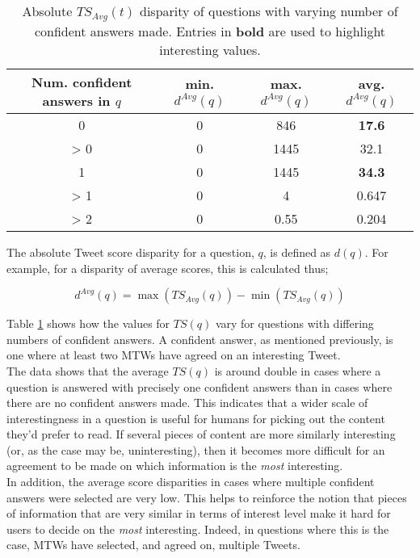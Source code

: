 \begin{table}[h]\footnotesize
\begin{center}
\begin{tabular}{ c | c | c | c }
	 Num. confident answers in $q$& min. $d^{Avg}(q)$ & max. $d^{Avg}(q)$ & avg. $d^{Avg}(q)$ \\
	 \hline
	0 & 0 & 846 & \textbf{17.6} \\
	> 0 & 0 & 1445 & 32.1 \\
	1 & 0 & 1445 & \textbf{34.3} \\
	> 1 & 0 & 4 & 0.647 \\
	> 2 & 0 & 0.55 & 0.204
\end{tabular}
\end{center}
\caption{Absolute $TS_{Avg}(t)$ disparity of questions with varying number of confident answers made. Entries in \textbf{bold} are used to highlight interesting values.}
\label{table:score_disparities}
\end{table}

The absolute Tweet score disparity for a question, $q$, is defined as $d(q)$. For example, for a disparity of average scores, this is calculated thus;

\[ d^{Avg}(q) = \max(TS_{Avg}(q)) - \min(TS_{Avg}(q)) \]

Table \ref{table:score_disparities} shows how the values for $TS(q)$ vary for questions with differing numbers of confident answers. A confident answer, as mentioned previously, is one where at least two MTWs have agreed on an interesting Tweet.\\
The data shows that the average $TS(q)$ is around double in cases where a question is answered with precisely one confident answers than in cases where there are no confident answers made. This indicates that a wider scale of interestingness in a question is useful for humans for picking out the content they'd prefer to read. If several pieces of content are more similarly interesting (or, as the case may be, uninteresting), then it becomes more difficult for an agreement to be made on which information is the \textit{most} interesting.\\
In addition, the average score disparities in cases where multiple confident answers were selected are very low. This helps to reinforce the notion that pieces of information that are very similar in terms of interest level make it hard for users to decide on the \textit{most} interesting. Indeed, in questions where this is the case, MTWs have selected, and agreed on, multiple Tweets.

